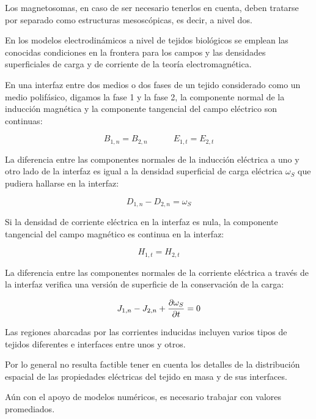 Los magnetosomas, en caso de ser necesario tenerlos en cuenta, deben tratarse por separado como estructuras mesoscópicas, es decir, a nivel dos.

En los modelos electrodinámicos a nivel de tejidos biológicos se emplean las conocidas condiciones en la frontera para los campos y las densidades superficiales de carga y de corriente de la teoría electromagnética.

En una interfaz entre dos medios o dos fases de un tejido considerado como un medio polifásico, digamos la fase 1 y la fase 2, la componente normal de la inducción magnética y la componente tangencial del campo eléctrico son continuas:

\begin{equation}
	B_{1,n}=B_{2,n} \quad \quad \quad E_{1,t}=E_{2,t}
\end{equation}


La diferencia entre las componentes normales de la inducción eléctrica a uno y otro lado de la interfaz es igual a la densidad superficial de carga eléctrica $\omega_{S}$ que pudiera hallarse en la interfaz:

\begin{equation}
	D_{1,n}-D_{2,n}=\omega_{S}
\end{equation}

Si la densidad de corriente eléctrica en la interfaz es nula, la componente tangencial del campo magnético es continua en la interfaz: 

\begin{equation}
	H_{1,t}=H_{2,t}
\end{equation}

La diferencia entre las componentes normales de la corriente eléctrica a través de la interfaz verifica una versión de superficie de la conservación de la carga:

\begin{equation}
	J_{1,n}-J_{2,n} + \dfrac{\partial \omega_{S}}{\partial t} = 0
\end{equation}

Las regiones abarcadas por las corrientes inducidas incluyen varios tipos de tejidos diferentes e interfaces entre unos y otros.

Por lo general no resulta factible tener en cuenta los detalles de la distribución espacial de las propiedades eléctricas del tejido en masa y de sus interfaces. 

Aún con el apoyo de modelos numéricos, es necesario trabajar con valores promediados.

